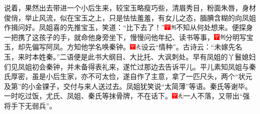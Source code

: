 说着，果然出去带进一个小后生来，较宝玉略瘦巧些，清眉秀目，粉面朱唇，身材俊俏，举止风流，似在宝玉之上，只是怯怯羞羞，有女儿之态，腼腆含糊的向凤姐作揖问好。凤姐喜的先推宝玉，笑道：``比下去了！''{\includegraphics[width=3mm]{../Images/00002}\includegraphics[width=3mm]{../Images/00011}\footnotesize \kaishu 不知从何处想来。}便探身一把携了这孩子的手，就命他身旁坐下，慢慢问他年纪、读书等事，{\includegraphics[width=3mm]{../Images/00002}\includegraphics[width=3mm]{../Images/00011}\footnotesize \kaishu 分明写宝玉，却先偏写阿凤。}方知他学名唤秦钟。{\includegraphics[width=3mm]{../Images/00002}\includegraphics[width=3mm]{../Images/00012}\footnotesize \kaishu 设云``情种''。古诗云：``未嫁先名玉，来时本姓秦。''二语便是此书大纲目、大比托、大讽刺处。}早有凤姐的丫鬟媳妇们见凤姐初会秦钟，并未备得表礼来，遂忙过那边去告诉平儿。平儿素知凤姐与秦氏厚密，虽是小后生家，亦不可太俭，遂自作了主意，拿了一匹尺头，两个``状元及第''的小金锞子，交付与来人送过去。凤姐犹笑说``太简薄''等语。秦氏等谢毕。一时吃过饭，尤氏、凤姐、秦氏等抹骨牌，不在话下。{\includegraphics[width=3mm]{../Images/00002}\includegraphics[width=3mm]{../Images/00012}\footnotesize \kaishu 一人不落，又带出``强将手下无弱兵''。}

